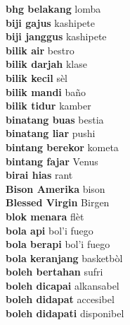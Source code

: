 \textbf{ bhg belakang  } lomba \\
\textbf{ biji gajus  } kashipete \\
\textbf{ biji janggus  } kashipete \\
\textbf{ bilik air  } bestro \\
\textbf{ bilik darjah  } klase \\
\textbf{ bilik kecil  } sèl \\
\textbf{ bilik mandi  } baño \\
\textbf{ bilik tidur  } kamber \\
\textbf{ binatang buas  } bestia \\
\textbf{ binatang liar  } pushi \\
\textbf{ bintang berekor  } kometa \\
\textbf{ bintang fajar  } Venus \\
\textbf{ birai hias  } rant \\
\textbf{ Bison Amerika  } bison \\
\textbf{ Blessed Virgin  } Birgen \\
\textbf{ blok menara  } flèt \\
\textbf{ bola api  } bol’i fuego \\
\textbf{ bola berapi  } bol’i fuego \\
\textbf{ bola keranjang  } basketbòl \\
\textbf{ boleh bertahan  } sufri \\
\textbf{ boleh dicapai  } alkansabel \\
\textbf{ boleh didapat  } accesibel \\
\textbf{ boleh didapati  } disponibel \\
